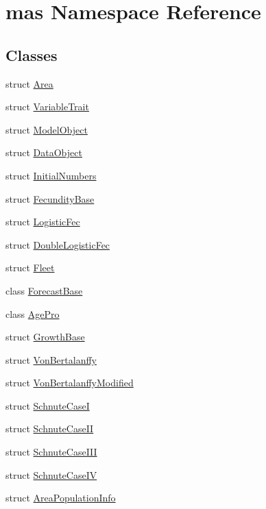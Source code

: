 \hypertarget{namespacemas}{\section{mas Namespace Reference}
\label{namespacemas}
}
\subsection*{Classes}
\begin{DoxyCompactItemize}
\item 
struct \hyperlink{structmas_1_1_area}{Area}
\item 
struct \hyperlink{structmas_1_1_variable_trait}{Variable\-Trait}
\item 
struct \hyperlink{structmas_1_1_model_object}{Model\-Object}
\item 
struct \hyperlink{structmas_1_1_data_object}{Data\-Object}
\item 
struct \hyperlink{structmas_1_1_initial_numbers}{Initial\-Numbers}
\item 
struct \hyperlink{structmas_1_1_fecundity_base}{Fecundity\-Base}
\item 
struct \hyperlink{structmas_1_1_logistic_fec}{Logistic\-Fec}
\item 
struct \hyperlink{structmas_1_1_double_logistic_fec}{Double\-Logistic\-Fec}
\item 
struct \hyperlink{structmas_1_1_fleet}{Fleet}
\item 
class \hyperlink{classmas_1_1_forecast_base}{Forecast\-Base}
\item 
class \hyperlink{classmas_1_1_age_pro}{Age\-Pro}
\item 
struct \hyperlink{structmas_1_1_growth_base}{Growth\-Base}
\item 
struct \hyperlink{structmas_1_1_von_bertalanffy}{Von\-Bertalanffy}
\item 
struct \hyperlink{structmas_1_1_von_bertalanffy_modified}{Von\-Bertalanffy\-Modified}
\item 
struct \hyperlink{structmas_1_1_schnute_case_i}{Schnute\-Case\-I}
\item 
struct \hyperlink{structmas_1_1_schnute_case_i_i}{Schnute\-Case\-I\-I}
\item 
struct \hyperlink{structmas_1_1_schnute_case_i_i_i}{Schnute\-Case\-I\-I\-I}
\item 
struct \hyperlink{structmas_1_1_schnute_case_i_v}{Schnute\-Case\-I\-V}
\item 
struct \hyperlink{structmas_1_1_area_population_info}{Area\-Population\-Info}

\end{DoxyCompactItemize}

